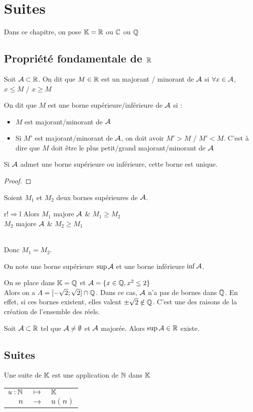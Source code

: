 \chapter{Suites}
Dans ce chapitre, on pose $\KK = \RR$ ou $\CC$ ou $\QQ$

\section{Propriété fondamentale de $\RR$}
Soit $\AA \subset \RR$.
On dit que $M \in \RR$ est un majorant / minorant de $\AA$ si $\forall x \in \AA$, $x \leq M$ / $x \geq M$

On dit que $M$ est une borne supérieure/inférieure de $\AA$ si :
\begin{itemize}
	\item $M$ est majorant/minorant de $\AA$
	\item Si $M'$ est majorant/minorant de $\AA$, on doit avoir $M'>M$ / $M'<M$. C'est à dire que $M$ doit être le plus petit/grand majorant/minorant de $\AA$
\end{itemize}

\prop
Si $\AA$ admet une borne supérieure ou inférieure, cette borne est unique.

\begin{proof}\end{proof}
Soient $M_1$ et $M_2$ deux bornes supérieures de $\AA$.\\
\begin{tabular}{r!{$\Rightarrow$}l}
	Alors $M_1$ majore $\AA$ & $M_1 \geq M_2$\\
	$M_2$ majore $\AA$ & $M_2 \geq M_1$
\end{tabular}\\
Donc $M_1=M_2$.

\nota
On note une borne supérieure $\sup \AA$ et une borne inférieure $\inf \AA$.

\rem
On se place dans $\KK = \QQ$ et $\AA = \{x\in \QQ, x^2\leq 2\}$\\
Alors on a $A =[-\sqrt{2};\sqrt{2}] \cap \QQ$. Dans ce cas, $\AA$ n'a pas de bornes dans $\QQ$. En effet, si ces bornes existent, elles valent $\pm \sqrt{2} \notin \QQ$. C'est une des raisons de la création de l'ensemble des réels.

\axio
Soit $\AA \subset \RR$ tel que $\AA \neq \emptyset$ et $\AA$ majorée. Alors $\sup \AA \in \RR$ existe.

\section{Suites}
Une suite de $\KK$ est une application de $\NN$ dans $\KK$\\
\begin{tabular}{rcl}
$u:\NN$ &$\longmapsto$&$\KK$\\
$n$&$\rightarrow$&$u(n)$
\end{tabular}


